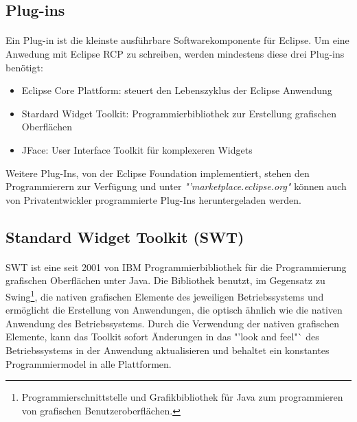 \subsection{Plug-ins}
\paragraph{}
Ein Plug-in ist die kleinste ausführbare Softwarekomponente für Eclipse. Um eine Anwedung mit Eclipse RCP zu schreiben, werden mindestens diese drei Plug-ins benötigt:
\begin{itemize}
\item Eclipse Core Plattform: steuert den Lebenszyklus der Eclipse Anwendung
\item Stardard Widget Toolkit: Programmierbibliothek zur Erstellung grafischen Oberflächen
\item JFace: User Interface Toolkit für komplexeren Widgets
\end{itemize}

Weitere Plug-Ins, von der Eclipse Foundation implementiert, stehen den Programmierern zur Verfügung und unter \textit{"'marketplace.eclipse.org"} können auch von Privatentwickler programmierte Plug-Ins heruntergeladen werden. \cite{Eclipse}

\subsection{Standard Widget Toolkit (SWT)}
\paragraph{}
SWT ist eine seit 2001 von IBM Programmierbibliothek für die Programmierung grafischen Oberflächen unter Java. Die Bibliothek benutzt, im Gegensatz zu Swing\footnote{Programmierschnittstelle und Grafikbibliothek für Java zum programmieren von grafischen Benutzeroberflächen.}, die nativen grafischen Elemente des jeweiligen Betriebssystems und ermöglicht die Erstellung von Anwendungen, die optisch ähnlich wie die nativen Anwendung des Betriebssystems. Durch die Verwendung der nativen grafischen Elemente, kann das Toolkit sofort Änderungen in das "'look and feel"` des Betriebssystems in der Anwendung aktualisieren und behaltet ein konstantes Programmiermodel in alle Plattformen.
\cite{EclipseSWT}\\

